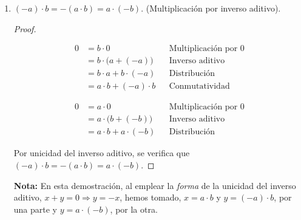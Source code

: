 \documentclass[11pt]{article}
\begin{document}
\begin{enumerate}[label=\alph*)]
    \item $(-a) \cdot b = -(a \cdot b) = a \cdot (-b)$. (Multiplicación por inverso aditivo).%
    \vspace{-1em}\begin{proof} \leavevmode
    \begin{center}\vspace{-2em}
    \begin{minipage}[t]{.5\linewidth}
        \begin{align*}
            0 &= b\cdot 0 && \text{Multiplicación por $0$}\\
            &= b \cdot \bigl(a+(-a)\bigr) && \text{Inverso aditivo}\\
            &= b\cdot a + b\cdot (-a) && \text{Distribución}\\
            &= a\cdot b + (-a) \cdot b && \text{Conmutatividad}
        \end{align*}
    \end{minipage}%
    \begin{minipage}[t]{.5\linewidth}
        \begin{align*}
            0 &= a\cdot 0 && \text{Multiplicación por $0$}\\
            &= a \cdot \bigl(b+(-b)\bigr) && \text{Inverso aditivo}\\
            &= a\cdot b + a\cdot (-b) && \text{Distribución}
        \end{align*}
    \end{minipage}
    \end{center} Por unicidad del inverso aditivo, se verifica que $(-a)\cdot b = -(a\cdot b)=a\cdot (-b)$.
    \end{proof}%
    \textbf{Nota:} En esta demostración, al emplear la \textit{forma} de la unicidad del inverso aditivo, $x+y=0 \Longrightarrow y=-x$, hemos tomado, $x=a\cdot b$ y $y=(-a)\cdot b$, por una parte y $y=a\cdot (-b)$, por la otra.

\end{enumerate}
\end{document}
